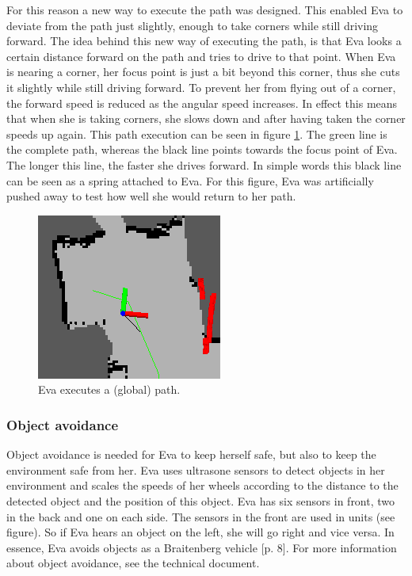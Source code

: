 \documentclass[project_eva.tex]{subfiles}
\begin{document}
For this reason a new way to execute the path was designed. This enabled Eva to deviate from the path just slightly, enough 
to take corners while still driving forward. The idea behind this new way of executing the path, is that Eva looks a 
certain distance forward on the path and tries to drive to that point. When Eva is nearing a corner, her focus point is 
just a bit beyond this corner, thus she cuts it slightly while still driving forward. To prevent her from flying out of a 
corner, the forward speed is reduced as the angular speed increases. In effect this means that when she is taking corners, 
she slows down and after having taken the corner speeds up again. This path execution can be seen in figure 
\ref{fig:global_path}. The green line is the complete path, whereas the black line points towards the focus point of Eva. 
The longer this line, the faster she drives forward. In simple words this black line can be seen as a spring attached to 
Eva. For this figure, Eva was artificially pushed away to test how well she would return to her path.
\begin{figure}[ht!]
	\centering
	\mbox{\includegraphics[scale=0.4]{Images/global_path.png}}
	\caption{Eva executes a (global) path.}
	\label{fig:global_path}
\end{figure}

\subsubsection*{Object avoidance}
Object avoidance is needed for Eva to keep herself safe, but also to keep the environment safe from her. Eva uses ultrasone 
sensors to detect objects in her environment and scales the speeds of her wheels according to the distance to the 
detected object and the position of this object. Eva has six sensors in front, two in the back and one on each side. The 
sensors in the front are used in units (see figure). So if Eva hears an object on the left, she will go right and vice 
versa. In essence, Eva avoids objects as a Braitenberg vehicle 
\cite{braitenberg} [p. 8]. For more information about object avoidance, see the 
technical document.
\end{document}
